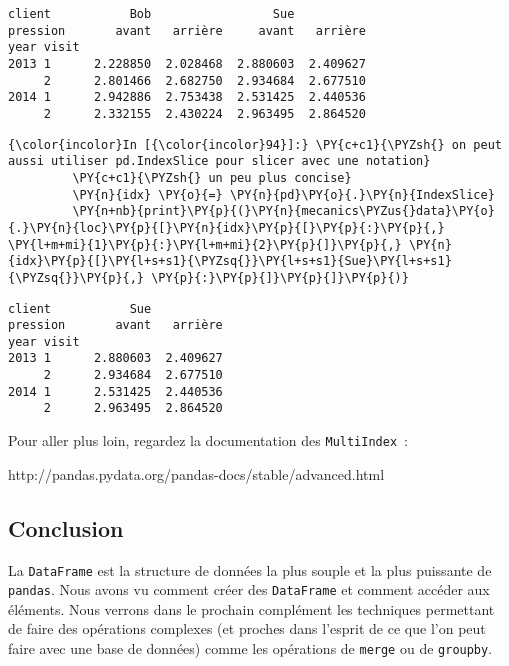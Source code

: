     \begin{Verbatim}[commandchars=\\\{\},frame=single,framerule=0.3mm,rulecolor=\color{cellframecolor}]
client           Bob                 Sue          
pression       avant   arrière     avant   arrière
year visit                                        
2013 1      2.228850  2.028468  2.880603  2.409627
     2      2.801466  2.682750  2.934684  2.677510
2014 1      2.942886  2.753438  2.531425  2.440536
     2      2.332155  2.430224  2.963495  2.864520
\end{Verbatim}

    \begin{Verbatim}[commandchars=\\\{\},frame=single,framerule=0.3mm,rulecolor=\color{cellframecolor}]
{\color{incolor}In [{\color{incolor}94}]:} \PY{c+c1}{\PYZsh{} on peut aussi utiliser pd.IndexSlice pour slicer avec une notation}
         \PY{c+c1}{\PYZsh{} un peu plus concise}
         \PY{n}{idx} \PY{o}{=} \PY{n}{pd}\PY{o}{.}\PY{n}{IndexSlice}
         \PY{n+nb}{print}\PY{p}{(}\PY{n}{mecanics\PYZus{}data}\PY{o}{.}\PY{n}{loc}\PY{p}{[}\PY{n}{idx}\PY{p}{[}\PY{p}{:}\PY{p}{,} \PY{l+m+mi}{1}\PY{p}{:}\PY{l+m+mi}{2}\PY{p}{]}\PY{p}{,} \PY{n}{idx}\PY{p}{[}\PY{l+s+s1}{\PYZsq{}}\PY{l+s+s1}{Sue}\PY{l+s+s1}{\PYZsq{}}\PY{p}{,} \PY{p}{:}\PY{p}{]}\PY{p}{]}\PY{p}{)}
\end{Verbatim}


    \begin{Verbatim}[commandchars=\\\{\},frame=single,framerule=0.3mm,rulecolor=\color{cellframecolor}]
client           Sue          
pression       avant   arrière
year visit                    
2013 1      2.880603  2.409627
     2      2.934684  2.677510
2014 1      2.531425  2.440536
     2      2.963495  2.864520
\end{Verbatim}

    Pour aller plus loin, regardez la documentation des
\texttt{MultiIndex}~:

http://pandas.pydata.org/pandas-docs/stable/advanced.html

    \hypertarget{conclusion}{%
\subsection{Conclusion}\label{conclusion}}

    La \texttt{DataFrame} est la structure de données la plus souple et la
plus puissante de \texttt{pandas}. Nous avons vu comment créer des
\texttt{DataFrame} et comment accéder aux éléments. Nous verrons dans le
prochain complément les techniques permettant de faire des opérations
complexes (et proches dans l'esprit de ce que l'on peut faire avec une
base de données) comme les opérations de \texttt{merge} ou de
\texttt{groupby}.


    
    
    
